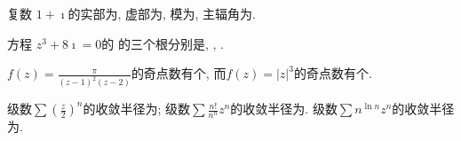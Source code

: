\documentclass{njustexam}
\begin{document}
\renewcommand{\course}{数学物理方法}                          %
\renewcommand{\duration}{120}                                            %
\renewcommand{\credit}{5}                                                   %
\renewcommand{\syllabus}{11044102}                               %
\renewcommand{\fullmark}{100}                                            %
\renewcommand{\composer}{罗凯}            %
\renewcommand{\composedate}{\today}                   %
\renewcommand{\validator}{}                                        %
\renewcommand{\coursetype}{1}                                            %
\renewcommand{\exammethod}{1}                                         %
\renewcommand{\testpaper}{A}                                              %

\makehead %


\begin{problem}
 复数 $1 + \imath $的实部为,  虚部为,  
 模为, 主辐角为. 
\end{problem}


\begin{problem}
方程 $z^3 + 8 \imath = 0$的
的三个根分别是\fillout{$2 \imath$}, 
, 
. 
\end{problem}



\begin{problem}
$f(z)=\frac{\pi}{(z-1)^2(z-2)}$的奇点数有个, 而$f(z)=|z|^3$的奇点数有个. 
\end{problem}



\begin{problem}
  级数$\sum (\frac{z}{2})^n$的收敛半径为;
  级数$\sum \frac{n !}{n^n} z^n$的收敛半径为. 
  级数$\sum n^{\ln{n}} z^n$的收敛半径为. 
 \end{problem}
\end{document}
